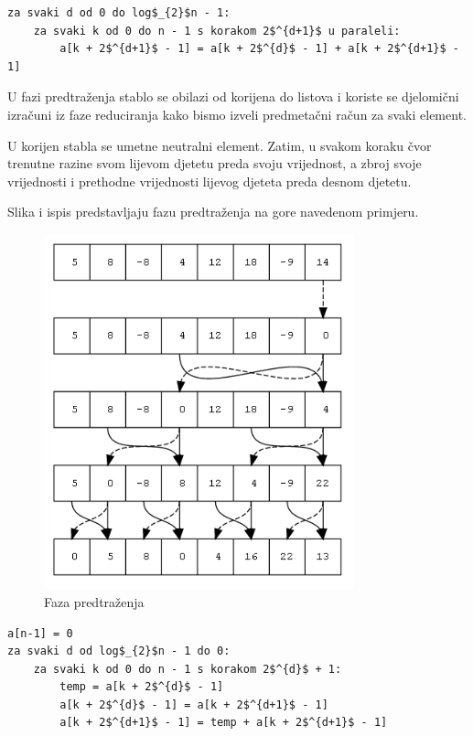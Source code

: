 \documentclass[times, utf8, zavrsni]{fer}
\begin{document}
\begin{singlespace}
\begin{lstlisting}[caption={Faza reduciranja}, label={reduciranje}]
za svaki d od 0 do log$_{2}$n - 1:
	za svaki k od 0 do n - 1 s korakom 2$^{d+1}$ u paraleli:
		a[k + 2$^{d+1}$ - 1] = a[k + 2$^{d}$ - 1] + a[k + 2$^{d+1}$ - 1]
\end{lstlisting}
\end{singlespace}

U fazi predtraženja stablo se obilazi od korijena do listova i koriste se djelomični izračuni iz faze reduciranja kako bismo izveli predmetačni račun za svaki element.

U korijen stabla se umetne neutralni element. Zatim, u svakom koraku čvor trenutne razine svom lijevom djetetu preda svoju vrijednost, a zbroj svoje vrijednosti i prethodne vrijednosti lijevog djeteta preda desnom djetetu.

Slika i ispis predstavljaju fazu predtraženja na gore navedenom primjeru.
\pagebreak

\begin{figure}[Htb]
\centering
\includegraphics[width=90mm]{predtrazenje.png}
\caption{Faza predtraženja}
\label{predtrazenje}
\end{figure}

\begin{singlespace}
\begin{lstlisting}[caption={Faza predtraženja}, label={prescan}]
a[n-1] = 0
za svaki d od log$_{2}$n - 1 do 0:
	za svaki k od 0 do n - 1 s korakom 2$^{d}$ + 1:
		temp = a[k + 2$^{d}$ - 1]
		a[k + 2$^{d}$ - 1] = a[k + 2$^{d+1}$ - 1]
		a[k + 2$^{d+1}$ - 1] = temp + a[k + 2$^{d+1}$ - 1]
\end{lstlisting}
\end{singlespace}
\end{document}
